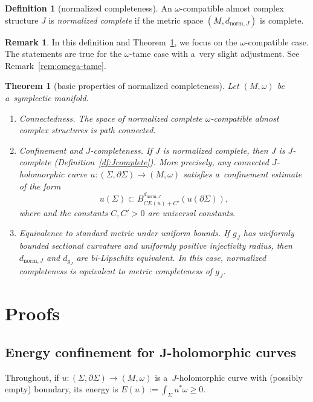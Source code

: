 \documentclass[10pt,a4paper]{amsart}
\numberwithin{equation}{section}
\newtheorem{tm}[Theorem]{Theorem}
\theoremstyle{definition}
\newtheorem{df}[Theorem]{Definition}
\newtheorem{rem}[Theorem]{Remark}
\begin{document}
\begin{df}[normalized completeness]\label{df:normalized-complete-intro}
An $\omega$-compatible almost complex structure $J$ is \emph{normalized complete} if the metric space $(M,d_{\mathrm{norm},J})$ is complete.
\end{df}
\begin{rem}
In this definition and Theorem~\ref{tm:normalized-completeness}, we focus on the $\omega$-compatible case. The statements are true for the $\omega$-tame case with a~very slight adjustment. See Remark~\ref{rem:omega-tame}.
\end{rem}


\begin{tm}[basic properties of normalized completeness]\label{tm:normalized-completeness}
Let $(M,\omega)$ be a~symplectic mani\-fold.
\begin{enumerate}
\itemsep=0pt
\item[$(1)$] \emph{Connectedness.}
The space of normalized complete $\omega$-compatible almost complex structures is path connected.

\item[$(2)$] \emph{Confinement and $J$-completeness.}
If $J$ is normalized complete, then $J$ is $J$-complete {\rm(}Definition~{\rm\ref{df:Jcomplete})}.
More precisely, any connected $J$-holomorphic curve $u\colon (\Sigma,\partial\Sigma)\to(M,\omega)$ satisfies a~confinement estimate of the form
\[
u(\Sigma)\subset B^{d_{\mathrm{norm},J}}_{CE(u)+C'}(u(\partial\Sigma)),
\]
where  and the constants $C,C'>0$ are universal constants.

\item[$(3)$] \emph{Equivalence to standard metric under uniform bounds.}
If $g_J$ has uniformly bounded sectional curvature and uniformly positive injectivity radius, then $d_{\mathrm{norm},J}$ and $d_{g_J}$ are bi-Lipschitz equivalent. In this case, normalized completeness is equivalent to metric completeness of $g_J$.
\end{enumerate}
\end{tm}

\section{Proofs}\label{sec:proofs}

\subsection[Energy confinement for J-holomorphic curves]{Energy confinement for $\boldsymbol{J}$-holomorphic curves}
Throughout, if $u\colon (\Sigma,\partial\Sigma)\to (M,\omega)$ is a~$J$-holomorphic curve with (possibly empty) boundary, its energy is
$
E(u):=\int_{\Sigma} u^{*}\omega \ge 0$.
\end{document}
